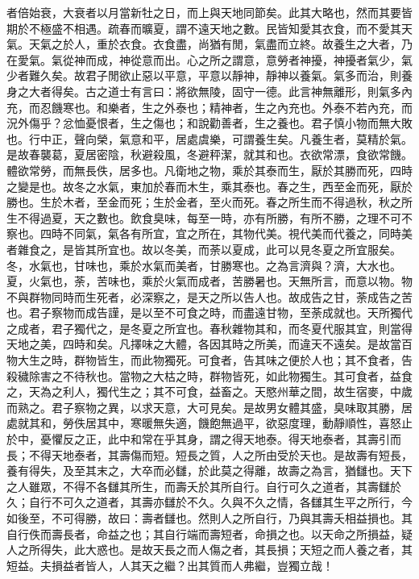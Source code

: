 者倍始衰，大衰者以月當新牡之日，而上與天地同節矣。此其大略也，然而其要皆期於不極盛不相遇。疏春而曠夏，謂不遠天地之數。民皆知愛其衣食，而不愛其天氣。天氣之於人，重於衣食。衣食盡，尚猶有閒，氣盡而立終。故養生之大者，乃在愛氣。氣從神而成，神從意而出。心之所之謂意，意勞者神擾，神擾者氣少，氣少者難久矣。故君子閒欲止惡以平意，平意以靜神，靜神以養氣。氣多而治，則養身之大者得矣。古之道士有言曰：將欲無陵，固守一德。此言神無離形，則氣多內充，而忍饑寒也。和樂者，生之外泰也；精神者，生之內充也。外泰不若內充，而況外傷乎？忿恤憂恨者，生之傷也；和說勸善者，生之養也。君子慎小物而無大敗也。行中正，聲向榮，氣意和平，居處虞樂，可謂養生矣。凡養生者，莫精於氣。是故春襲葛，夏居密陰，秋避殺風，冬避秤潔，就其和也。衣欲常漂，食欲常饑。體欲常勞，而無長佚，居多也。凡衛地之物，乘於其泰而生，厭於其勝而死，四時之變是也。故冬之水氣，東加於春而木生，乘其泰也。春之生，西至金而死，厭於勝也。生於木者，至金而死；生於金者，至火而死。春之所生而不得過秋，秋之所生不得過夏，天之數也。飲食臭味，每至一時，亦有所勝，有所不勝，之理不可不察也。四時不同氣，氣各有所宜，宜之所在，其物代美。視代美而代養之，同時美者雜食之，是皆其所宜也。故以冬美，而荼以夏成，此可以見冬夏之所宜服矣。冬，水氣也，甘味也，乘於水氣而美者，甘勝寒也。之為言濟與？濟，大水也。夏，火氣也，荼，苦味也，乘於火氣而成者，苦勝暑也。天無所言，而意以物。物不與群物同時而生死者，必深察之，是天之所以告人也。故成告之甘，荼成告之苦也。君子察物而成告謹，是以至不可食之時，而盡遠甘物，至荼成就也。天所獨代之成者，君子獨代之，是冬夏之所宜也。春秋雜物其和，而冬夏代服其宜，則當得天地之美，四時和矣。凡擇味之大體，各因其時之所美，而違天不遠矣。是故當百物大生之時，群物皆生，而此物獨死。可食者，告其味之便於人也；其不食者，告殺穢除害之不待秋也。當物之大枯之時，群物皆死，如此物獨生。其可食者，益食之，天為之利人，獨代生之；其不可食，益畜之。天愍州華之間，故生宿麥，中歲而熟之。君子察物之異，以求天意，大可見矣。是故男女體其盛，臭味取其勝，居處就其和，勞佚居其中，寒暖無失適，饑飽無過平，欲惡度理，動靜順性，喜怒止於中，憂懼反之正，此中和常在乎其身，謂之得天地泰。得天地泰者，其壽引而長；不得天地泰者，其壽傷而短。短長之質，人之所由受於天也。是故壽有短長，養有得失，及至其末之，大卒而必讎，於此莫之得離，故壽之為言，猶讎也。天下之人雖眾，不得不各讎其所生，而壽夭於其所自行。自行可久之道者，其壽讎於久；自行不可久之道者，其壽亦讎於不久。久與不久之情，各讎其生平之所行，今如後至，不可得勝，故曰：壽者讎也。然則人之所自行，乃與其壽夭相益損也。其自行佚而壽長者，命益之也；其自行端而壽短者，命損之也。以天命之所損益，疑人之所得失，此大惑也。是故天長之而人傷之者，其長損；天短之而人養之者，其短益。夫損益者皆人，人其天之繼？出其質而人弗繼，豈獨立哉！

